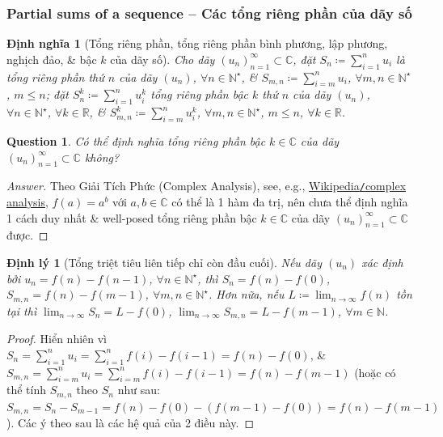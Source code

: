 \documentclass{article}
\newtheorem{dinhly}{Định lý}
\newtheorem{dinhnghia}{Định nghĩa}
\newtheorem{question}{Question}
\begin{document}

\subsubsection{Partial sums of a sequence -- Các tổng riêng phần của dãy số}

\begin{dinhnghia}[Tổng riêng phần, tổng riêng phần bình phương, lập phương, nghịch đảo, \& bậc $k$ của dãy số]
	Cho dãy $(u_n)_{n=1}^\infty\subset\mathbb{C}$, đặt $S_n\coloneqq\sum_{i=1}^n u_i$ là {\rm tổng riêng phần thứ $n$} của dãy $(u_n)$, $\forall n\in\mathbb{N}^\star$, \& $S_{m,n}\coloneqq\sum_{i=m}^n u_i$, $\forall m,n\in\mathbb{N}^\star$, $m\le n$; đặt $S_n^k\coloneqq\sum_{i=1}^n u_i^k$ {\rm tổng riêng phần bậc $k$ thứ $n$} của dãy $(u_n)$, $\forall n\in\mathbb{N}^\star$, $\forall k\in\mathbb{R}$, \& $S_{m,n}^k\coloneqq\sum_{i=m}^n u_i^k$, $\forall m,n\in\mathbb{N}^\star$, $m\le n$, $\forall k\in\mathbb{R}$.
\end{dinhnghia}

\begin{question}
	Có thể định nghĩa tổng riêng phần bậc $k\in\mathbb{C}$ của dãy $(u_n)_{n=1}^\infty\subset\mathbb{C}$ không?
\end{question}

\begin{proof}[Answer]
	Theo Giải Tích Phức (Complex Analysis), see, e.g., \href{https://en.wikipedia.org/wiki/Complex_analysis}{Wikipedia{\tt/}complex analysis}, $f(a) = a^b$ với $a,b\in\mathbb{C}$ có thể là 1 hàm đa trị, nên chưa thể định nghĩa 1 cách duy nhất \& well-posed tổng riêng phần bậc $k\in\mathbb{C}$ của dãy $(u_n)_{n=1}^\infty\subset\mathbb{C}$ được.
\end{proof}

\begin{dinhly}[Tổng triệt tiêu liên tiếp chỉ còn đầu cuối]
	\label{thm: eliminated sum}
	Nếu dãy $(u_n)$ xác định bởi $u_n = f(n) - f(n - 1)$, $\forall n\in\mathbb{N}^\star$, thì $S_n = f(n) - f(0)$, $S_{m,n} = f(n) - f(m - 1)$, $\forall m,n\in\mathbb{N}^\star$. Hơn nữa, nếu $L\coloneqq\lim_{n\to\infty} f(n)$ tồn tại thì $\lim_{n\to\infty} S_n = L - f(0)$, $\lim_{n\to\infty} S_{m,n} = L - f(m - 1)$, $\forall m\in\mathbb{N}$.
\end{dinhly}

\begin{proof}
	Hiển nhiên vì $S_n = \sum_{i=1}^n u_i = \sum_{i=1}^n f(i) - f(i - 1) = f(n) - f(0)$, \& $S_{m,n} = \sum_{i=m}^n u_i = \sum_{i=m}^n f(i) - f(i - 1) = f(n) - f(m - 1)$ (hoặc có thể tính $S_{m,n}$ theo $S_n$ như sau: $S_{m,n} = S_n - S_{m-1} = f(n) - f(0) - (f(m - 1) - f(0)) = f(n) - f(m - 1)$). Các ý theo sau là các hệ quả của 2 điều này.
\end{proof}
\end{document}
